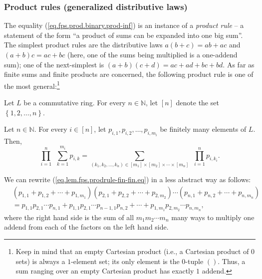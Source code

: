 \subsubsection{Product rules (generalized distributive laws)}

The equality (\ref{eq.fps.prod.binary.prod-inf}) is an instance of a
\emph{product rule} -- a statement of the form \textquotedblleft a product of
sums can be expanded into one big sum\textquotedblright. The simplest product
rules are the distributive laws $a\left(  b+c\right)  =ab+ac$ and $\left(
a+b\right)  c=ac+bc$ (here, one of the sums being multiplied is a one-addend
sum); one of the next-simplest is $\left(  a+b\right)  \left(  c+d\right)
=ac+ad+bc+bd$. As far as finite sums and finite products are concerned, the
following product rule is one of the most general:\footnote{Keep in mind that
an empty Cartesian product (i.e., a Cartesian product of $0$ sets) is always a
$1$-element set; its only element is the $0$-tuple $\left(  {}\right)  $.
Thus, a sum ranging over an empty Cartesian product has exactly $1$ addend.}

\begin{proposition}
\label{prop.fps.prodrule-fin-fin}Let $L$ be a commutative ring. For every
$n\in\mathbb{N}$, let $\left[  n\right]  $ denote the set $\left\{
1,2,\ldots,n\right\}  $.

Let $n\in\mathbb{N}$. For every $i\in\left[  n\right]  $, let $p_{i,1}%
,p_{i,2},\ldots,p_{i,m_{i}}$ be finitely many elements of $L$. Then,%
\begin{equation}
\prod_{i=1}^{n}\ \ \sum_{k=1}^{m_{i}}p_{i,k}=\sum_{\left(  k_{1},k_{2}%
,\ldots,k_{n}\right)  \in\left[  m_{1}\right]  \times\left[  m_{2}\right]
\times\cdots\times\left[  m_{n}\right]  }\ \ \prod_{i=1}^{n}p_{i,k_{i}}.
\label{eq.lem.fps.prodrule-fin-fin.eq}%
\end{equation}

\end{proposition}

We can rewrite (\ref{eq.lem.fps.prodrule-fin-fin.eq}) in a less abstract way
as follows:%
\begin{align*}
&  \left(  p_{1,1}+p_{1,2}+\cdots+p_{1,m_{1}}\right)  \left(  p_{2,1}%
+p_{2,2}+\cdots+p_{2,m_{2}}\right)  \cdots\left(  p_{n,1}+p_{n,2}%
+\cdots+p_{n,m_{n}}\right) \\
&  =p_{1,1}p_{2,1}\cdots p_{n,1}+p_{1,1}p_{2,1}\cdots p_{n-1,1}p_{n,2}%
+\cdots+p_{1,m_{1}}p_{2,m_{2}}\cdots p_{n,m_{n}},
\end{align*}
where the right hand side is the sum of all $m_{1}m_{2}\cdots m_{n}$ many ways
to multiply one addend from each of the factors on the left hand side.

